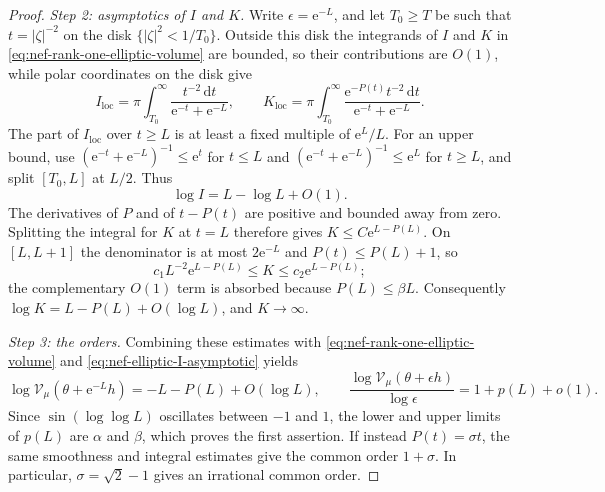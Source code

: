 \begin{proof}
\emph{Step 2: asymptotics of $I$ and $K$.} Write $\epsilon=\mathrm{e}^{-L}$, and let $T_0\geq T$ be such that $t=|\zeta|^{-2}$ on the disk $\{|\zeta|^2<1/T_0\}$. Outside this disk the integrands of $I$ and $K$ in \eqref{eq:nef-rank-one-elliptic-volume} are bounded, so their contributions are $O(1)$, while polar coordinates on the disk give
\[
 I_{\mathrm{loc}}=\pi\int_{T_0}^\infty
 \frac{t^{-2}\,\mathrm{d} t}{\mathrm{e}^{-t}+\mathrm{e}^{-L}},\qquad
 K_{\mathrm{loc}}=\pi\int_{T_0}^\infty
 \frac{\mathrm{e}^{-P(t)}t^{-2}\,\mathrm{d} t}{\mathrm{e}^{-t}+\mathrm{e}^{-L}}.
\]
The part of $I_{\mathrm{loc}}$ over $t\geq L$ is at least a fixed multiple of $\mathrm{e}^L/L$. For an upper bound, use $(\mathrm{e}^{-t}+\mathrm{e}^{-L})^{-1}\leq\mathrm{e}^t$ for $t\leq L$ and $(\mathrm{e}^{-t}+\mathrm{e}^{-L})^{-1}\leq\mathrm{e}^L$ for $t\geq L$, and split $[T_0,L]$ at $L/2$. Thus
\begin{equation}\label{eq:nef-elliptic-I-asymptotic}
 \log I=L-\log L+O(1).
\end{equation}
The derivatives of $P$ and of $t-P(t)$ are positive and bounded away from zero. Splitting the integral for $K$ at $t=L$ therefore gives $K\leq C\mathrm{e}^{L-P(L)}$. On $[L,L+1]$ the denominator is at most $2\mathrm{e}^{-L}$ and $P(t)\leq P(L)+1$, so
\[
 c_1L^{-2}\mathrm{e}^{L-P(L)}\leq K\leq c_2\mathrm{e}^{L-P(L)};
\]
the complementary $O(1)$ term is absorbed because $P(L)\leq\beta L$. Consequently $\log K=L-P(L)+O(\log L)$, and $K\to\infty$.

\emph{Step 3: the orders.} Combining these estimates with \eqref{eq:nef-rank-one-elliptic-volume} and \eqref{eq:nef-elliptic-I-asymptotic} yields
\begin{equation}\label{eq:nef-oscillatory-log-volume}
 \log \mathcal V_\mu(\theta+\mathrm{e}^{-L}h)=-L-P(L)+O(\log L),
 \qquad
 \frac{\log \mathcal V_\mu(\theta+\epsilon h)}{\log\epsilon}
 =1+p(L)+o(1).
\end{equation}
Since $\sin(\log\log L)$ oscillates between $-1$ and $1$, the lower and upper limits of $p(L)$ are $\alpha$ and $\beta$, which proves the first assertion. If instead $P(t)=\sigma t$, the same smoothness and integral estimates give the common order $1+\sigma$. In particular, $\sigma=\sqrt2-1$ gives an irrational common order.
\end{proof}

